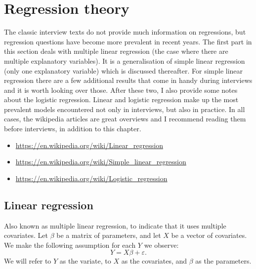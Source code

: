 \documentclass[a4paper]{article}
\begin{document}

\section{Regression theory}
\label{sec:regressiontheory}
The classic interview texts do not provide much information on regressions, but regression questions have become more prevalent in recent years.
The first part in this section deals with multiple linear regression (the case where there are multiple explanatory variables). It is a generalisation of simple linear regression (only one explanatory variable) which is discussed thereafter.
For simple linear regression there are a few additional results that come in handy during interviews and it is worth looking over those.
After these two, I also provide some notes about the logistic regression.
Linear and logistic regression make up the most prevalent models encountered not only in interviews, but also in practice.
In all cases, the wikipedia articles are great overviews and I recommend reading them before interviews, in addition to this chapter.\\
\begin{itemize}
  \item \url{https://en.wikipedia.org/wiki/Linear_regression}
  \item \url{https://en.wikipedia.org/wiki/Simple_linear_regression}
  \item \url{https://en.wikipedia.org/wiki/Logistic_regression}
\end{itemize}

\subsection{Linear regression}
Also known as multiple linear regression, to indicate that it uses multiple covariates.
Let $\beta$ be a matrix of parameters, and let $X$ be a vector of covariates.
We make the following assumption for each $Y$ we observe:
\[
  Y = X \beta + \varepsilon
  \text{.}
\]
We will refer to $Y$ as the variate, to $X$ as the covariates, and $\beta$ as the parameters.
\end{document}
